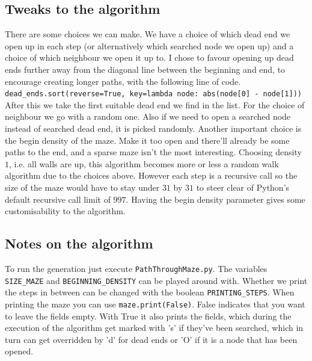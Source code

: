 \documentclass[10pt, a4paper, twoside]{amsart}
\newcommand{\1}{\mathbbm{1}}
\begin{document}
\subsection{Tweaks to the algorithm}
There are some choices we can make.
We have a choice of which dead end we open up in each step (or alternatively which searched node we open up) and a choice of which neighbour we open it up to.
I chose to favour opening up dead ends further away from the diagonal line between the beginning and end, to encourage creating longer paths, with the following line of code.\\
\verb+dead_ends.sort(reverse=True, key=lambda node: abs(node[0] - node[1]))+\\
After this we take the first suitable dead end we find in the list. For the choice of neighbour we go with a random one. Also if we need to open a searched node instead of searched dead end, it is picked randomly.
Another important choice is the begin density of the maze. Make it too open and there'll already be some paths to the end, and a sparse maze isn't the most interesting. Choosing density $1$, i.e. all walls are up, this algorithm becomes more or less a random walk algorithm due to the choices above. However each step is a recursive call so the size of the maze would have to stay under $31$ by $31$ to steer clear of Python's default recursive call limit of $997$. Having the begin density parameter gives some customisability to the algorithm.

\subsection{Notes on the algorithm}
To run the generation just execute \verb+PathThroughMaze.py+. The variables \verb+SIZE_MAZE+ and \verb+BEGINNING_DENSITY+ can be played around with. Whether we print the steps in between can be changed with the boolean \verb+PRINTING_STEPS+. When printing the maze you can use \verb+maze.print(False)+. False indicates that you want to leave the fields empty. With True it also prints the fields, which during the execution of the algorithm get marked with 's' if they've been searched, which in turn can get overridden by 'd' for dead ends or 'O' if it is a node that has been opened.\\
\end{document}
